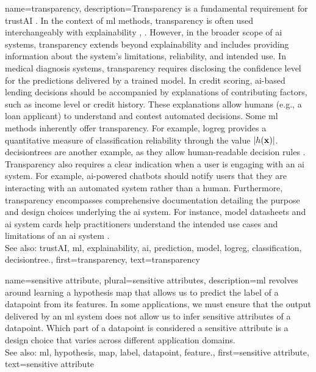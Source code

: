 {name={transparency},
	description={Transparency is a fundamental requirement for 
		\gls{trustAI} \cite{HLEGTrustworhtyAI}. In the context of \gls{ml} 
		methods, transparency is often used interchangeably with \gls{explainability} 
		\cite{JunXML2020}, \cite{gallese2023ai}. However, in the broader scope of \gls{ai} 
		systems, transparency extends beyond \gls{explainability} and includes providing information 
		about the system’s limitations, reliability, and intended use. 
		In medical diagnosis systems, transparency requires disclosing the confidence level 
		for the \glspl{prediction} delivered by a trained \gls{model}. In credit scoring, 
		\gls{ai}-based lending decisions should be accompanied by explanations of 
		contributing factors, such as income level or credit history. These explanations 
		allow humans (e.g., a loan applicant) to understand and contest automated decisions. 
		Some \gls{ml} methods inherently offer transparency. For example, \gls{logreg} 
		provides a quantitative measure of \gls{classification} reliability through the value $|h({\bf x})|$. 
		\Glspl{decisiontree} are another example, as they allow human-readable decision rules \cite{rudin2019stop}.
		Transparency also requires a clear indication when a user is engaging with an \gls{ai} system. 
		For example, \gls{ai}-powered chatbots should notify users that they are interacting with an 
		automated system rather than a human. Furthermore, transparency encompasses comprehensive 
		documentation detailing the purpose and design choices underlying the \gls{ai} system. 
		For instance, \gls{model} datasheets \cite{DatasheetData2021} and \gls{ai} system cards \cite{10.1145/3287560.3287596} 
		help practitioners understand the intended use cases and limitations of an \gls{ai} system \cite{Shahriari2017}.
					\\ 
		See also: \gls{trustAI}, \gls{ml}, \gls{explainability}, \gls{ai}, \gls{prediction}, \gls{model}, \gls{logreg}, \gls{classification}, \gls{decisiontree}.},
	first={transparency}, 
	text={transparency} 
}



{name={sensitive attribute}, plural={sensitive attributes},
	description={\gls{ml} revolves around learning a \gls{hypothesis} \gls{map} that allows 
		us to predict the \gls{label} of a \gls{datapoint} from its \glspl{feature}. In some 
		applications, we must ensure that the output delivered by an \gls{ml} system does 
		not allow us to infer sensitive attributes of a \gls{datapoint}. Which part 
		of a \gls{datapoint} is considered a sensitive attribute is a design 
		choice that varies across different application domains.
					\\ 
		See also: \gls{ml}, \gls{hypothesis}, \gls{map}, \gls{label}, \gls{datapoint}, \gls{feature}.},
	first={sensitive attribute},
	text={sensitive attribute} 
}


